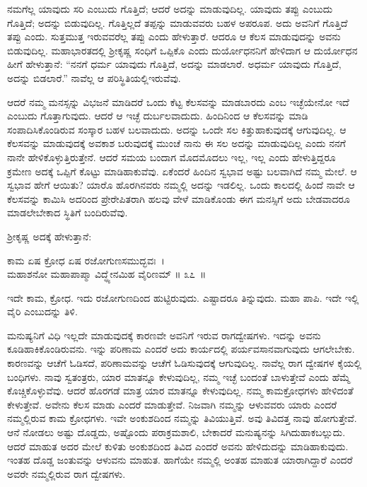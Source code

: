 ನಮಗೆಲ್ಲ ಯಾವುದು ಸರಿ ಎಂಬುದು ಗೊತ್ತಿದೆ; ಆದರೆ ಅದನ್ನು ಮಾಡುವುದಿಲ್ಲ. ಯಾವುದು ತಪ್ಪು ಎಂಬುದು ಗೊತ್ತಿದೆ; ಅದನ್ನು ಬಿಡುವುದಿಲ್ಲ. ಗೊತ್ತಿಲ್ಲದೆ ತಪ್ಪನ್ನು ಮಾಡುವವರು ಬಹಳ ಅಪರೂಪ. ಅದು ಅವನಿಗೆ ಗೊತ್ತಿದೆ ತಪ್ಪು ಎಂದು. ಸುತ್ತಮುತ್ತ ಇರುವವರೆಲ್ಲ ತಪ್ಪು ಎಂದು ಹೇಳುತ್ತಾರೆ. ಆದರೂ ಆ ಕೆಲಸ ಮಾಡುವುದನ್ನು ಅವನು ಬಿಡುವುದಿಲ್ಲ. ಮಹಾಭಾರತದಲ್ಲಿ ಶ‍್ರೀಕೃಷ್ಣ ಸಂಧಿಗೆ ಒಪ್ಪಿಕೊ ಎಂದು ದುರ್ಯೋಧನನಿಗೆ ಹೇಳಿದಾಗ ಆ ದುರ್ಯೋಧನ ಹೀಗೆ ಹೇಳುತ್ತಾನೆ: “ನನಗೆ ಧರ್ಮ ಯಾವುದು ಗೊತ್ತಿದೆ, ಅದನ್ನು ಮಾಡಲಾರೆ. ಅಧರ್ಮ ಯಾವುದು ಗೊತ್ತಿದೆ, ಅದನ್ನು ಬಿಡಲಾರೆ.” ನಾವೆಲ್ಲ ಆ ಪರಿಸ್ಥಿತಿಯಲ್ಲಿಇರುವೆವು.

ಆದರೆ ನಮ್ಮ ಮನಸ್ಸನ್ನು ವಿಭಜನೆ ಮಾಡಿದರೆ ಒಂದು ಕೆಟ್ಟ ಕೆಲಸವನ್ನು ಮಾಡಬಾರದು ಎಂಬ ಇಚ್ಛೆಯೇನೋ ಇದೆ ಎಂಬುದು ಗೊತ್ತಾಗುವುದು. ಆದರೆ ಆ ಇಚ್ಛೆ ದುರ್ಬಲವಾದುದು. ಹಿಂದಿನಿಂದ ಆ ಕೆಲಸವನ್ನು ಮಾಡಿ ಸಂಪಾದಿಸಿಕೊಂಡಿರುವ ಸಂಸ್ಕಾರ ಬಹಳ ಬಲವಾದುದು. ಅದನ್ನು ಒಂದೇ ಸಲ ಕಿತ್ತುಹಾಕುವುದಕ್ಕೆ ಆಗುವುದಿಲ್ಲ. ಆ ಕೆಲಸವನ್ನು ಮಾಡುವುದಕ್ಕೆ ಅವಕಾಶ ಬರುವುದಕ್ಕೆ ಮುಂಚೆ ನಾನು ಈ ಸಲ ಅದನ್ನು ಮಾಡುವುದಿಲ್ಲ ಎಂದು ನನಗೆ ನಾನೇ ಹೇಳಿಕೊಳ್ಳುತ್ತಿರುತ್ತೇನೆ. ಆದರೆ ಸಮಯ ಬಂದಾಗ ಮೊದಮೊದಲು ಇಲ್ಲ, ಇಲ್ಲ ಎಂದು ಹೇಳುತ್ತಿದ್ದರೂ ಕ್ರಮೇಣ ಅದಕ್ಕೆ ಒಪ್ಪಿಗೆ ಕೊಟ್ಟು ಮಾಡಿಹಾಕುವೆವು. ಏಕೆಂದರೆ ಹಿಂದಿನ ಸ್ವಭಾವ ಅಷ್ಟು ಬಲವಾಗಿದೆ ನಮ್ಮ ಮೇಲೆ. ಆ ಸ್ವಭಾವ ಹೇಗೆ ಆಯಿತು? ಯಾರೊ ಹೊರಗಿನವರು ನಮ್ಮಲ್ಲಿ ಅದನ್ನು ಇಡಲಿಲ್ಲ. ಒಂದು ಕಾಲದಲ್ಲಿ ಹಿಂದೆ ನಾವೇ ಆ ಕೆಲಸವನ್ನು ಕಾಮಿಸಿ ಅದರಿಂದ ಪ್ರೇರೇಪಿತರಾಗಿ ಹಲವು ವೇಳೆ ಮಾಡಿಕೊಂಡು ಈಗ ಮನಸ್ಸಿಗೆ ಅದು ಬೇಡವಾದರೂ ಮಾಡಲೇಬೇಕಾದ ಸ್ಥಿತಿಗೆ ಬಂದಿರುವೆವು.

\newpage

ಶ‍್ರೀಕೃಷ್ಣ ಅದಕ್ಕೆ ಹೇಳುತ್ತಾನೆ:

\begin{shloka}
ಕಾಮ ಏಷ ಕ್ರೋಧ ಏಷ ರಜೋಗುಣಸಮುದ್ಭವಃ~।\\ಮಹಾಶನೋ ಮಹಾಪಾಪ್ಮಾ ವಿದ್ಧ್ಯೇನಮಿಹ ವೈರಿಣಮ್ \hfill॥ ೩೭~॥
\end{shloka}

\begin{artha}
ಇದೇ ಕಾಮ, ಕ್ರೋಧ. ಇದು ರಜೋಗುಣದಿಂದ ಹುಟ್ಟಿರುವುದು. ಎಷ್ಟಾದರೂ ತಿನ್ನುವುದು. ಮಹಾ ಪಾಪಿ. ಇದೇ ಇಲ್ಲಿ ವೈರಿ ಎಂಬುದನ್ನು ತಿಳಿ.
\end{artha}

ಮನುಷ್ಯನಿಗೆ ವಿಧಿ ಇಲ್ಲದೇ ಮಾಡುವುದಕ್ಕೆ ಕಾರಣವೇ ಅವನಿಗೆ ಇರುವ ರಾಗದ್ವೇಷಗಳು. ಇದನ್ನು ಅವನು ಕೂಡಿಹಾಕಿಕೊಂಡಿರುವನು. ಇನ್ನು ಪರಿಣಾಮ ಎಂದರೆ ಅದು ಕಾರ್ಯದಲ್ಲಿ ಪರ್ಯವಸಾನವಾಗುವುದು ಆಗಲೇಬೇಕು. ಕಾರಣವನ್ನು ಆಚೆಗೆ ಓಡಿಸದೆ, ಪರಿಣಾಮವನ್ನು ಆಚೆಗೆ ಓಡಿಸುವುದಕ್ಕೆ ಆಗುವುದಿಲ್ಲ. ನಾವೆಲ್ಲ ರಾಗ ದ್ವೇಷಗಳ ಕೈಯಲ್ಲಿ ಬಂಧಿಗಳು. ನಾವು ಸ್ವತಂತ್ರರು, ಯಾರ ಮಾತನ್ನೂ ಕೇಳುವುದಿಲ್ಲ, ನಮ್ಮ ಇಚ್ಛೆ ಬಂದಂತೆ ಬಾಳುತ್ತೇವೆ ಎಂದು ಹೆಮ್ಮೆ ಕೊಚ್ಚಿಕೊಳ್ಳುವೆವು. ಆದರೆ ಹೊರಗಡೆ ಮಾತ್ರ ಯಾರ ಮಾತನ್ನೂ ಕೇಳುವುದಿಲ್ಲ. ನಮ್ಮ ಕಾಮಕ್ರೋಧಗಳು ಹೇಳಿದಂತೆ ಕೇಳುತ್ತೇವೆ. ಅವೇನು ಕೆಲಸ ಮಾಡು ಎಂದರೆ ಮಾಡುತ್ತೇವೆ. ನಿಜವಾಗಿ ನಮ್ಮನ್ನು ಆಳುವವರು ಯಾರು ಎಂದರೆ ನಮ್ಮಲ್ಲಿರುವ ಕಾಮ ಕ್ರೋಧಗಳು. ಇವೇ ಅಂಕುಶದಿಂದ ನಮ್ಮನ್ನು ತಿವಿಯುತ್ತಿವೆ. ಅವು ತಿವಿದತ್ತ ನಾವು ಹೋಗುತ್ತೇವೆ. ಆನೆ ನೋಡಲು ಅಷ್ಟು ದೊಡ್ಡದು, ಅಷ್ಟೊಂದು ಪರಾಕ್ರಮಶಾಲಿ, ಬೇಕಾದರೆ ಮನುಷ್ಯನನ್ನು ಸಿಗಿದುಹಾಕಬಲ್ಲುದು. ಆದರೆ ಮಾಹುತ ಅದರ ಮೇಲೆ ಕುಳಿತು ಅಂಕುಶದಿಂದ ತಿವಿದ ಎಂದರೆ ಅವನು ಹೇಳಿದುದನ್ನು ಮಾಡಿಹಾಕುವುದು. ಇಂತಹ ದೊಡ್ಡ ಜಂತುವನ್ನು ಆಳುವನು ಮಾಹುತ. ಹಾಗೆಯೇ ನಮ್ಮಲ್ಲಿ ಅಂತಹ ಮಾಹುತ ಯಾರಾಗಿದ್ದಾರೆ ಎಂದರೆ ಅವರೇ ನಮ್ಮಲ್ಲಿರುವ ರಾಗ ದ್ವೇಷಗಳು.

